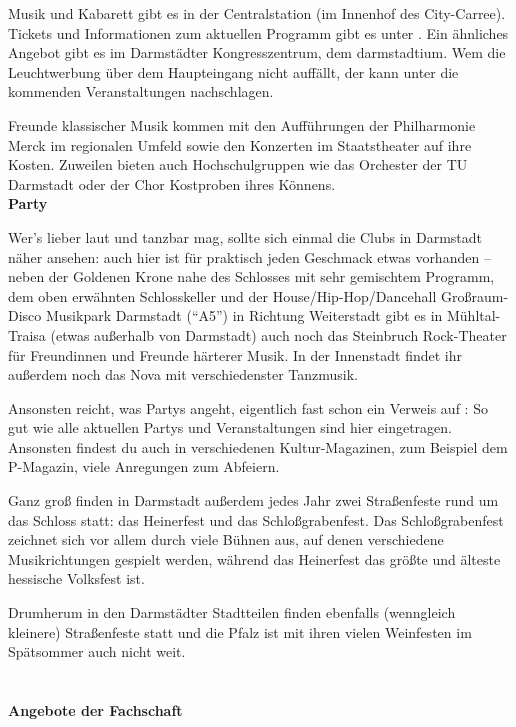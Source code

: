 {    Musik und Kabarett gibt es in der Centralstation (im Innenhof des City-Carree). Tickets und Informationen zum aktuellen Programm gibt es unter \footnotemark[9]. Ein ähnliches Angebot gibt es im Darmstädter Kongresszentrum, dem darmstadtium. Wem die Leuchtwerbung über dem Haupteingang nicht auffällt, der kann unter \footnotemark[10] die kommenden Veranstaltungen nachschlagen.

    Freunde klassischer Musik kommen mit den Aufführungen der Philharmonie Merck im regionalen Umfeld sowie den Konzerten im Staatstheater auf ihre Kosten. Zuweilen bieten auch Hochschulgruppen wie das Orchester der TU Darmstadt oder der Chor Kostproben ihres Könnens.\\

    \textbf{Party}

    Wer's lieber laut und tanzbar mag, sollte sich einmal die Clubs in Darmstadt näher ansehen: auch hier ist für praktisch jeden Geschmack etwas vorhanden – neben der Goldenen Krone nahe des Schlosses mit sehr gemischtem Programm, dem oben erwähnten Schlosskeller und der House/Hip-Hop/Dancehall Großraum-Disco Musikpark Darmstadt ("`A5"') in Richtung Weiterstadt gibt es in Mühltal-Traisa (etwas außerhalb von Darmstadt) auch noch das Steinbruch Rock-Theater für Freundinnen und Freunde härterer Musik.
    In der Innenstadt findet ihr außerdem noch das Nova mit verschiedenster Tanzmusik.

    Ansonsten reicht, was Partys angeht, eigentlich fast schon ein Verweis auf \footnotemark[11]: So gut wie alle aktuellen Partys und Veranstaltungen sind hier eingetragen. Ansonsten findest du auch in verschiedenen Kultur-Magazinen, zum Beispiel dem P-Magazin, viele Anregungen zum Abfeiern.

    Ganz groß finden in Darmstadt außerdem jedes Jahr zwei Straßenfeste rund um das Schloss statt: das Heinerfest und das Schloßgrabenfest. Das Schloßgrabenfest zeichnet sich vor allem durch viele Bühnen aus, auf denen verschiedene Musikrichtungen gespielt werden, während das Heinerfest das größte und älteste hessische Volksfest ist.

    Drumherum in den Darmstädter Stadtteilen finden ebenfalls (wenngleich kleinere) Straßenfeste statt und die Pfalz ist mit ihren vielen Weinfesten im Spätsommer auch nicht weit. \\
    \\\\
    \textbf{Angebote der Fachschaft}

}
